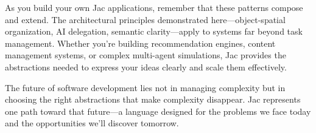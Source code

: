 As you build your own Jac applications, remember that these patterns compose and extend. The architectural principles demonstrated here—object-spatial organization, AI delegation, semantic clarity—apply to systems far beyond task management. Whether you're building recommendation engines, content management systems, or complex multi-agent simulations, Jac provides the abstractions needed to express your ideas clearly and scale them effectively.

The future of software development lies not in managing complexity but in choosing the right abstractions that make complexity disappear. Jac represents one path toward that future—a language designed for the problems we face today and the opportunities we'll discover tomorrow.